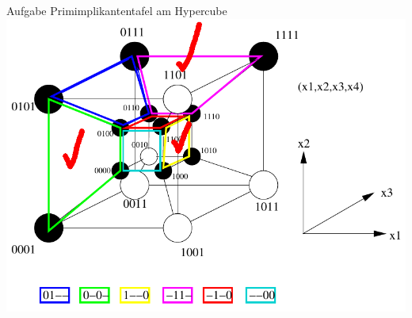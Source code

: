 \begin{frame}[allowframebreaks]{Aufgabe \thesection}{Primimplikantentafel am Hypercube}
  \includegraphics[height=0.6\pageheight, center]{./figures/hypercube.png}
\end{frame}

